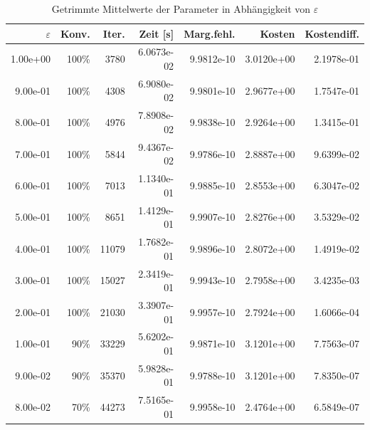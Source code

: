 \begin{table}[htbp]
\caption{Getrimmte Mittelwerte der Parameter in Abhängigkeit von $\varepsilon$}
\label{tab:Parametertest128_tol1e-09}
\small
\centering
{}
\begin{tabular}{rrrrrrr}
\toprule
$\varepsilon$ & Konv. & Iter. & Zeit [s] & Marg.fehl. & Kosten & Kostendiff. \\
\midrule
1.00e+00 & 100\% & 3780 & 6.0673e-02 & 9.9812e-10 & 3.0120e+00 & 2.1978e-01 \\
9.00e-01 & 100\% & 4308 & 6.9080e-02 & 9.9801e-10 & 2.9677e+00 & 1.7547e-01 \\
8.00e-01 & 100\% & 4976 & 7.8908e-02 & 9.9838e-10 & 2.9264e+00 & 1.3415e-01 \\
7.00e-01 & 100\% & 5844 & 9.4367e-02 & 9.9786e-10 & 2.8887e+00 & 9.6399e-02 \\
6.00e-01 & 100\% & 7013 & 1.1340e-01 & 9.9885e-10 & 2.8553e+00 & 6.3047e-02 \\
5.00e-01 & 100\% & 8651 & 1.4129e-01 & 9.9907e-10 & 2.8276e+00 & 3.5329e-02 \\
4.00e-01 & 100\% & 11079 & 1.7682e-01 & 9.9896e-10 & 2.8072e+00 & 1.4919e-02 \\
3.00e-01 & 100\% & 15027 & 2.3419e-01 & 9.9943e-10 & 2.7958e+00 & 3.4235e-03 \\
2.00e-01 & 100\% & 21030 & 3.3907e-01 & 9.9957e-10 & 2.7924e+00 & 1.6066e-04 \\
1.00e-01 & 90\% & 33229 & 5.6202e-01 & 9.9871e-10 & 3.1201e+00 & 7.7563e-07 \\
9.00e-02 & 90\% & 35370 & 5.9828e-01 & 9.9788e-10 & 3.1201e+00 & 7.8350e-07 \\
8.00e-02 & 70\% & 44273 & 7.5165e-01 & 9.9958e-10 & 2.4764e+00 & 6.5849e-07 \\
\bottomrule
\end{tabular}
\end{table}
